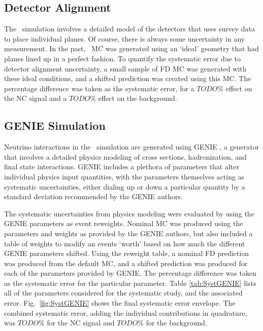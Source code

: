 \subsection{Detector Alignment}

The \nova~simulation involves a detailed model of the detectors that uses survey data to place individual planes. Of course, there is always some uncertainty in any measurement. In the past, \nova~MC was generated using an `ideal' geometry that had planes lined up in a perfect fashion. To quantify the systematic error due to detector alignment uncertainty, a small sample of FD MC was generated with these ideal conditions, and a shifted prediction was created using this MC. The percentage difference was taken as the systematic error, for a $TODO\%$ effect on the NC signal and a $TODO\%$ effect on the background.

\subsection{GENIE Simulation}

Neutrino interactions in the \nova~simulation are generated using GENIE \cite{ref:GENIE}, a generator that involves a detailed physics modeling of cross sections, hadronization, and final state interactions. GENIE includes a plethora of parameters that alter individual physics input quantities, with the parameters themselves acting as systematic uncertainties, either dialing up or down a particular quantity by a standard deviation recommended by the GENIE authors.

The systematic uncertainties from physics modeling were evaluated by using the GENIE parameters as event reweights. Nominal MC was produced using the parameters and weights as provided by the GENIE authors, but also included a table of weights to modify an events `worth' based on how much the different GENIE parameters shifted. Using the reweight table, a nominal FD prediction was produced from the default MC, and a shifted prediction was produced for each of the parameters provided by GENIE. The percentage difference was taken as the systematic error for the particular parameter. Table \ref{tab:SystGENIE} lists all of the parameters considered for the systematic study, and the associated error. Fig.~\ref{fig:SystGENIE} shows the final systematic error envelope. The combined systematic error, adding the individual contributions in quadrature, was $TODO\%$ for the NC signal and $TODO\%$ for the background.

